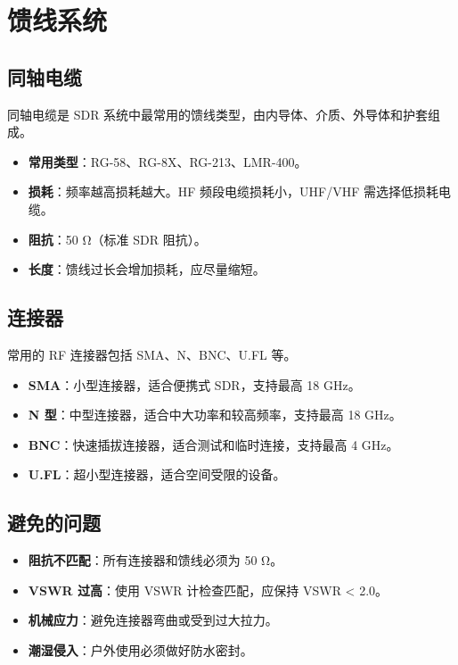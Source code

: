 \documentclass[12pt,UTF8]{ctexbook}
\begin{document}
\section{馈线系统}
\label{sec:feedline}

\subsection{同轴电缆}
同轴电缆是 SDR 系统中最常用的馈线类型，由内导体、介质、外导体和护套组成。

\begin{itemize}[leftmargin=2cm]
    \item \textbf{常用类型}：RG-58、RG-8X、RG-213、LMR-400。
    \item \textbf{损耗}：频率越高损耗越大。HF 频段电缆损耗小，UHF/VHF 需选择低损耗电缆。
    \item \textbf{阻抗}：50 Ω（标准 SDR 阻抗）。
    \item \textbf{长度}：馈线过长会增加损耗，应尽量缩短。
\end{itemize}

\subsection{连接器}
常用的 RF 连接器包括 SMA、N、BNC、U.FL 等。

\begin{itemize}[leftmargin=2cm]
    \item \textbf{SMA}：小型连接器，适合便携式 SDR，支持最高 18 GHz。
    \item \textbf{N 型}：中型连接器，适合中大功率和较高频率，支持最高 18 GHz。
    \item \textbf{BNC}：快速插拔连接器，适合测试和临时连接，支持最高 4 GHz。
    \item \textbf{U.FL}：超小型连接器，适合空间受限的设备。
\end{itemize}

\subsection{避免的问题}
\begin{itemize}[leftmargin=2cm]
    \item \textbf{阻抗不匹配}：所有连接器和馈线必须为 50 Ω。
    \item \textbf{VSWR 过高}：使用 VSWR 计检查匹配，应保持 VSWR < 2.0。
    \item \textbf{机械应力}：避免连接器弯曲或受到过大拉力。
    \item \textbf{潮湿侵入}：户外使用必须做好防水密封。
\end{itemize}
\end{document}
